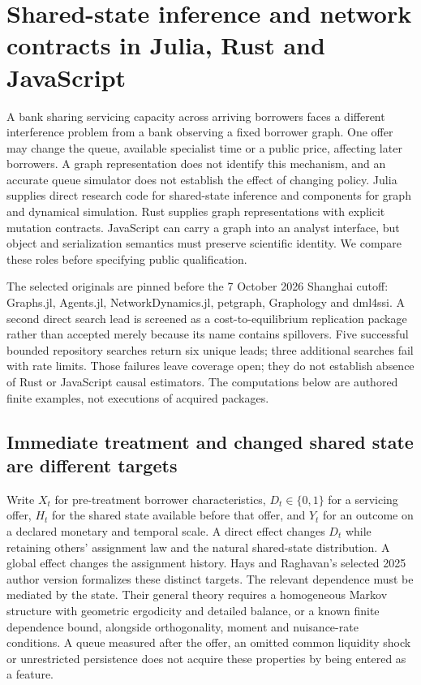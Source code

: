 \section[Shared-state and remaining-language networks]{Shared-state inference and network contracts in Julia, Rust and JavaScript}
\label{sec:exec25-onet}

A bank sharing servicing capacity across arriving borrowers faces a different
interference problem from a bank observing a fixed borrower graph. One offer
may change the queue, available specialist time or a public price, affecting
later borrowers. A graph representation does not identify this mechanism, and
an accurate queue simulator does not establish the effect of changing policy.
Julia supplies direct research code for shared-state inference and components
for graph and dynamical simulation. Rust supplies graph representations with
explicit mutation contracts. JavaScript can carry a graph into an analyst
interface, but object and serialization semantics must preserve scientific
identity. We compare these roles before specifying public qualification.

The selected originals are pinned before the 7 October 2026 Shanghai cutoff:
Graphs.jl, Agents.jl, NetworkDynamics.jl, petgraph, Graphology and dml4ssi.
A second direct search lead is screened as a cost-to-equilibrium replication
package rather than accepted merely because its name contains spillovers.
Five successful bounded repository searches return six unique leads; three
additional searches fail with rate limits. Those failures leave coverage open;
they do not establish absence of Rust or JavaScript causal estimators. The
computations below are authored finite examples, not executions of acquired
packages.~\citep{exec25_onet_choice}

\subsection{Immediate treatment and changed shared state are different targets}

Write $X_t$ for pre-treatment borrower characteristics, $D_t\in\{0,1\}$ for a
servicing offer, $H_t$ for the shared state available before that offer, and
$Y_t$ for an outcome on a declared monetary and temporal scale. A direct effect
changes $D_t$ while retaining others' assignment law and the natural
shared-state distribution. A global effect changes the assignment history.
Hays and Raghavan's selected 2025 author version formalizes these distinct
targets. The relevant dependence must be mediated by the state. Their general
theory requires a homogeneous Markov structure with geometric ergodicity and
detailed balance, or a known finite dependence bound, alongside orthogonality,
moment and nuisance-rate conditions. A queue measured after the offer, an
omitted common liquidity shock or unrestricted persistence does not acquire
these properties by being entered as a feature.~\citep{exec25_onet_paper}

